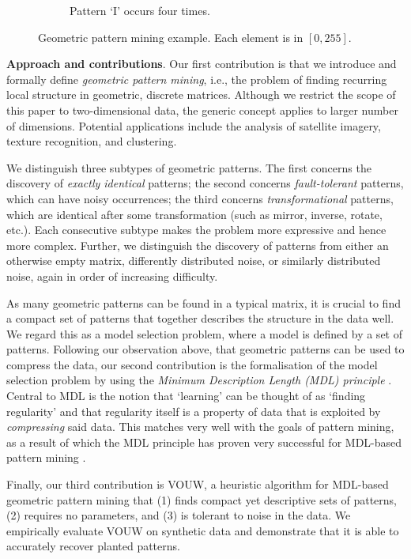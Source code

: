 \documentclass{llncs}
\begin{document}
\begin{figure}[t]
\begin{subfigure}[t]{0.37\textwidth}
\caption{Pattern `I' occurs four times.}
\label{fig-example1c}
\end{subfigure}%
\caption{Geometric pattern mining example. Each element is in $[0,255]$.}
\label{fig-example1}
\end{figure}  

\smallskip
\noindent \textbf{Approach and contributions}. Our first contribution is that we introduce and formally define \emph{geometric pattern mining}, i.e., the problem of finding recurring local structure in geometric, discrete matrices. Although we restrict the scope of this paper to two-dimensional data, the generic concept applies to larger number of dimensions. Potential applications include the analysis of satellite imagery, texture recognition, and clustering.

We distinguish three subtypes of geometric patterns. The first concerns the discovery of \emph{exactly identical} patterns; the second concerns \emph{fault-tolerant} patterns, which can have noisy occurrences; the third concerns \emph{transformational} patterns, which are identical after some transformation (such as mirror, inverse, rotate, etc.). Each consecutive subtype makes the problem more expressive and hence more complex. Further, we distinguish the discovery of patterns from either an otherwise empty matrix, differently distributed noise, or similarly distributed noise, again in order of increasing difficulty.

As many geometric patterns can be found in a typical matrix, it is crucial to find a compact set of patterns that together describes the structure in the data well. We regard this as a model selection problem, where a model is defined by a set of patterns. Following our observation above, that geometric patterns can be used to compress the data, our second contribution is the formalisation of the model selection problem by using the \emph{Minimum Description Length (MDL) principle} \cite{rissanenmdl,grunwaldmdl}. Central to MDL is the notion that `learning' can be thought of as `finding regularity' and that regularity itself is a property of data that is exploited by \emph{compressing} said data. This matches very well with the goals of pattern mining, as a result of which the MDL principle has proven very successful for MDL-based pattern mining \cite{krimp,classy}.

Finally, our third contribution is VOUW, a heuristic algorithm for MDL-based geometric pattern mining that (1) finds compact yet descriptive sets of patterns, (2) requires no parameters, and (3) is tolerant to noise in the data. We empirically evaluate VOUW on synthetic data and demonstrate that it is able to accurately recover planted patterns.
\end{document}
